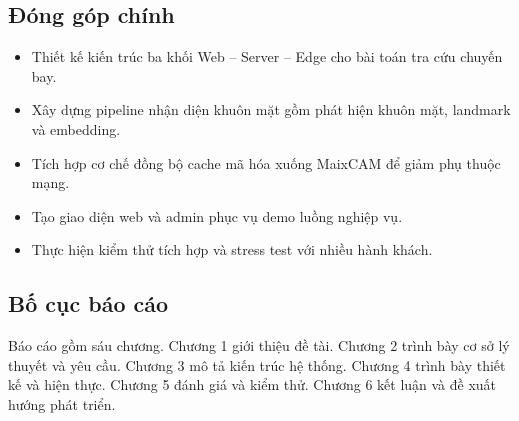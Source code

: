 \subsection{Đóng góp chính}
\begin{itemize}
  \item Thiết kế kiến trúc ba khối Web -- Server -- Edge cho bài toán tra cứu chuyến bay.
  \item Xây dựng pipeline nhận diện khuôn mặt gồm phát hiện khuôn mặt, landmark và embedding.
  \item Tích hợp cơ chế đồng bộ cache mã hóa xuống MaixCAM để giảm phụ thuộc mạng.
  \item Tạo giao diện web và admin phục vụ demo luồng nghiệp vụ.
  \item Thực hiện kiểm thử tích hợp và stress test với nhiều hành khách.
\end{itemize}

\subsection{Bố cục báo cáo}
Báo cáo gồm sáu chương. Chương 1 giới thiệu đề tài. Chương 2 trình bày cơ sở lý thuyết và yêu cầu. Chương 3 mô tả kiến trúc hệ thống. Chương 4 trình bày thiết kế và hiện thực. Chương 5 đánh giá và kiểm thử. Chương 6 kết luận và đề xuất hướng phát triển.

